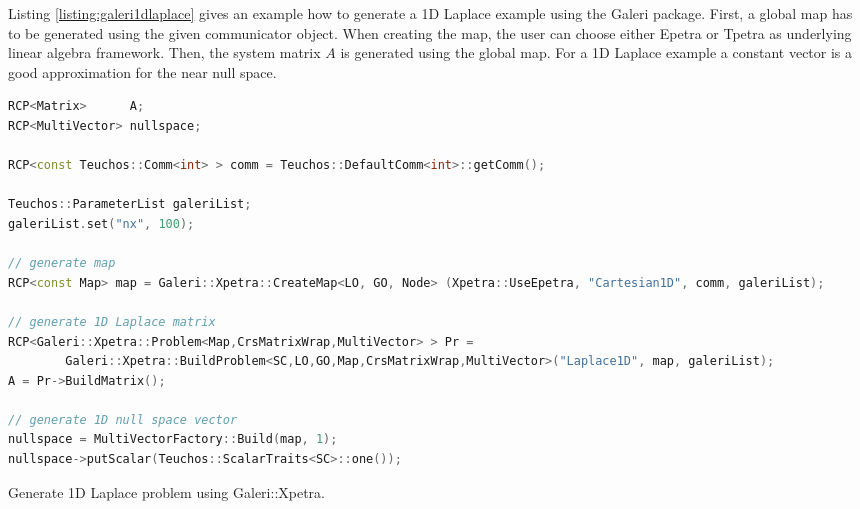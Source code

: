 Listing \ref{listing:galeri1dlaplace} gives an example how to generate a 1D Laplace example using the Galeri package. First, a global map has to be generated using the given communicator object. When creating the map, the user can choose either Epetra or Tpetra as underlying linear algebra framework. Then, the system matrix $A$ is generated using the global map. For a 1D Laplace example a constant vector is a good approximation for the near null space.
\begin{Listing} 
\begin{center} 
\begin{lstlisting}[language=C++,label=listing:galeri1dlaplace]
RCP<Matrix>      A;
RCP<MultiVector> nullspace;

RCP<const Teuchos::Comm<int> > comm = Teuchos::DefaultComm<int>::getComm();

Teuchos::ParameterList galeriList;
galeriList.set("nx", 100);
    
// generate map
RCP<const Map> map = Galeri::Xpetra::CreateMap<LO, GO, Node> (Xpetra::UseEpetra, "Cartesian1D", comm, galeriList);

// generate 1D Laplace matrix
RCP<Galeri::Xpetra::Problem<Map,CrsMatrixWrap,MultiVector> > Pr =
        Galeri::Xpetra::BuildProblem<SC,LO,GO,Map,CrsMatrixWrap,MultiVector>("Laplace1D", map, galeriList);
A = Pr->BuildMatrix();

// generate 1D null space vector
nullspace = MultiVectorFactory::Build(map, 1);
nullspace->putScalar(Teuchos::ScalarTraits<SC>::one());
\end{lstlisting}
\caption{Generate 1D Laplace problem using Galeri::Xpetra.} 
\label{listing:galeri1dlaplace}
\end{center}
\end{Listing}


